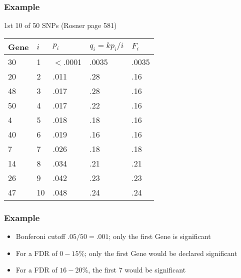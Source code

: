 \documentclass[aspectratio=169]{beamer}
\begin{document}
\begin{frame}\frametitle{Example}
1st 10 of 50 SNPs (Rosner page 581)\\
\begin{center}
\ttfamily
\begin{tabular}{lllll}
Gene & $i$ & $p_i$ & $q_i=kp_i/i$ & $F_i$ \\ \hline
 30 & 1 & $<$.0001 & .0035 & .0035 \\
 20 & 2 & .011     & .28   & .16   \\
 48 & 3 & .017     & .28   & .16   \\
 50 & 4 & .017     & .22   & .16   \\
  4 & 5 & .018     & .18   & .16   \\
 40 & 6 & .019     & .16   & .16   \\
  7 & 7 & .026     & .18   & .18   \\
 14 & 8 & .034     & .21   & .21   \\
 26 & 9 & .042     & .23   & .23   \\
 47 & 10& .048     & .24   & .24   \\ \hline
\end{tabular}
\normalfont
\end{center}
\end{frame}

\begin{frame}\frametitle{Example}
\begin{itemize}
\item Bonferoni cutoff $.05 / 50 = .001$; only the first Gene is significant
\item For a FDR of $0-15\%$; only the first Gene would be declared significant
\item For a FDR of $16-20\%$, the first $7$ would be significant
\end{itemize}
\end{frame}
\end{document}
